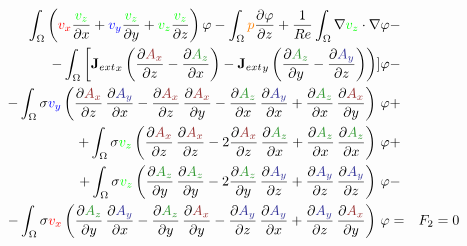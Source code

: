 \documentclass[smallextended]{svjour3}       %
\begin{document}
\begin{eqnarray}
			\int_{\Omega} \left(\textcolor{red}{v_x} \frac{\textcolor{gre}{v_z}}{\partial x} + \textcolor{blu}{v_y} \frac{\textcolor{gre}{v_z}}{\partial y} + \textcolor{gre}{v_z} \frac{\textcolor{gre}{v_z}}{\partial z}\right) \varphi
			- \int_{\Omega} \textcolor{orange}{p} \frac{\partial \varphi}{\partial z}
			+ \frac{1}{Re} \int_{\Omega} \nabla \textcolor{gre}{v_z} \cdot \nabla \varphi \nonumber & -\\
			- \int_{\Omega} \left[{\mathbf{J}_{ext}}_x \left(\frac{\partial \textcolor{darkred}{A_x}}{\partial z} - \frac{\partial \textcolor{darkgre}{A_z}}{\partial x}\right) - {\mathbf{J}_{ext}}_y \left(\frac{\partial \textcolor{darkgre}{A_z}}{\partial y} - \frac{\partial \textcolor{darkblu}{A_y}}{\partial z}\right)\right)] \varphi			
			\nonumber & -\\			- \int_{\Omega} \sigma \textcolor{blu}{v_y} \left(\frac{\partial \textcolor{darkred}{A_x}}{\partial z}\,\frac{\partial \textcolor{darkblu}{A_y}}{\partial x} - \frac{\partial \textcolor{darkred}{A_x}}{\partial z}\,\frac{\partial \textcolor{darkred}{A_x}}{\partial y} - \frac{\partial \textcolor{darkgre}{A_z}}{\partial x}\,\frac{\partial \textcolor{darkblu}{A_y}}{\partial x}  + \frac{\partial \textcolor{darkgre}{A_z}}{\partial x}\,\frac{\partial \textcolor{darkred}{A_x}}{\partial y} \right)\, \varphi& +\nonumber \\			
			+ \int_{\Omega} \sigma \textcolor{gre}{v_z} \left(\frac{\partial \textcolor{darkred}{A_x}}{\partial z}\,\frac{\partial \textcolor{darkred}{A_x}}{\partial z} - 2 \frac{\partial \textcolor{darkred}{A_x}}{\partial z}\,\frac{\partial \textcolor{darkgre}{A_z}}{\partial x} + \frac{\partial \textcolor{darkgre}{A_z}}{\partial x}\,\frac{\partial \textcolor{darkgre}{A_z}}{\partial x} \right)\, \varphi& +\nonumber \\			
			+ \int_{\Omega} \sigma \textcolor{gre}{v_z} \left(\frac{\partial \textcolor{darkgre}{A_z}}{\partial y}\,\frac{\partial \textcolor{darkgre}{A_z}}{\partial y} - 2 \frac{\partial \textcolor{darkgre}{A_z}}{\partial y}\,\frac{\partial \textcolor{darkblu}{A_y}}{\partial z} + \frac{\partial \textcolor{darkblu}{A_y}}{\partial z}\,\frac{\partial \textcolor{darkblu}{A_y}}{\partial z} \right)\, \varphi& -\nonumber \\			
			- \int_{\Omega} \sigma \textcolor{red}{v_x} \left(\frac{\partial \textcolor{darkgre}{A_z}}{\partial y}\,\frac{\partial \textcolor{darkblu}{A_y}}{\partial x} - \frac{\partial \textcolor{darkgre}{A_z}}{\partial y}\,\frac{\partial \textcolor{darkred}{A_x}}{\partial y} - \frac{\partial \textcolor{darkblu}{A_y}}{\partial z}\,\frac{\partial \textcolor{darkblu}{A_y}}{\partial x} + \frac{\partial \textcolor{darkblu}{A_y}}{\partial z}\,\frac{\partial \textcolor{darkred}{A_x}}{\partial y} \right)\, \varphi& = & F_2 = 0 \\				

\end{eqnarray}
\end{document}
